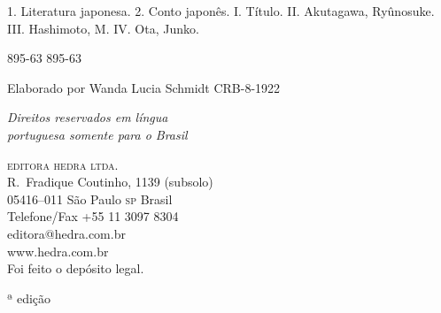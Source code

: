 {\hspace{20pt}\parbox{185pt}{1. Literatura japonesa. 2. Conto japonês. I. Título. II. Akutagawa, Ryûnosuke. III. Hashimoto, M. IV. Ota, Junko.}

\hspace{20pt} 895-63 \hspace{138pt} 895-63

\hrulefill

\hspace{10pt}Elaborado por Wanda Lucia Schmidt CRB-8-1922

\medskip

\vfill\textit{Direitos reservados em l\'ingua\\ portuguesa somente para o Brasil}\\\medskip

%
\textsc{editora hedra ltda.}\\
R.~Fradique Coutinho, 1139 (subsolo)\\
05416--011 São Paulo \textsc{sp} Brasil\\
Telefone/Fax +55 11 3097 8304\\\smallskip
editora@hedra.com.br\\
www.hedra.com.br\\
\bigskip
Foi feito o depósito legal.\\\endgroup
\pagebreak\raggedleft
\titulagem

{\Large \autor \par\vspace{1.5ex}}
\vspace{1.5cm}

{{\footnotesize{} ª edição} \par}

}
